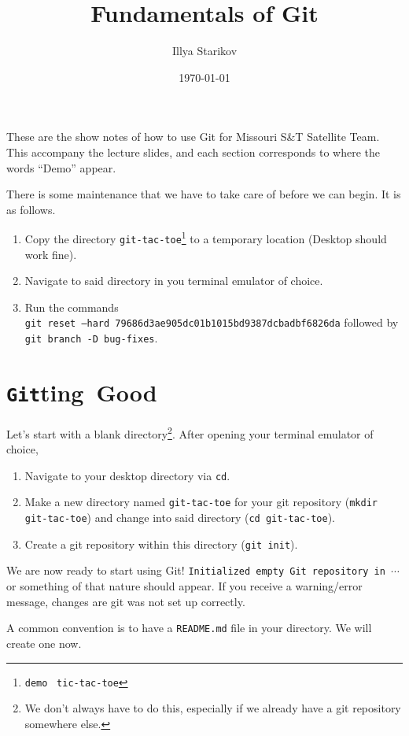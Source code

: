 \documentclass[12pt]{article}
\title{Fundamentals of Git}
\date{\today}
\author{Illya Starikov}
\newcommand{\shellcmd}[1]{\texttt{\colorbox{gray!30}{#1}}}
\begin{document}
\maketitle

These are the show notes of how to use Git for Missouri S\&T Satellite Team. This accompany the lecture slides, and each section corresponds to where the words ``Demo'' appear.

There is some maintenance that we have to take care of before we can begin. It is as follows.

\begin{enumerate}
    \item Copy the directory \texttt{git-tac-toe}\footnote{\texttt{demo} \textrightarrow \ \texttt{tic-tac-toe}} to a temporary location (Desktop should work fine).
    \item Navigate to said directory in you terminal emulator of choice.
    \item Run the commands \\ \shellcmd{git reset --hard 79686d3ae905dc01b1015bd9387dcbadbf6826da} followed by \shellcmd{git branch -D bug-fixes}. 
\end{enumerate}

\section{\texorpdfstring{\shellcmd{Git}ting} \ \ Good}
Let's start with a blank directory\footnote{We don't always have to do this, especially if we already have a git repository somewhere else.}. After opening your terminal emulator of choice,

\begin{enumerate}
    \item Navigate to your desktop directory via \shellcmd{cd}.
    \item Make a new directory named \texttt{git-tac-toe} for your git repository (\shellcmd{mkdir git-tac-toe}) and change into said directory (\shellcmd{cd git-tac-toe}).
    \item Create a git repository within this directory (\shellcmd{git init}).
\end{enumerate}

\noindent We are now ready to start using Git! \texttt{Initialized empty Git repository in $\cdots$} or something of that nature should appear. If you receive a warning/error message, changes are git was not set up correctly.

A common convention is to have a \texttt{README.md} file in your directory. We will create one now.
\end{document}
